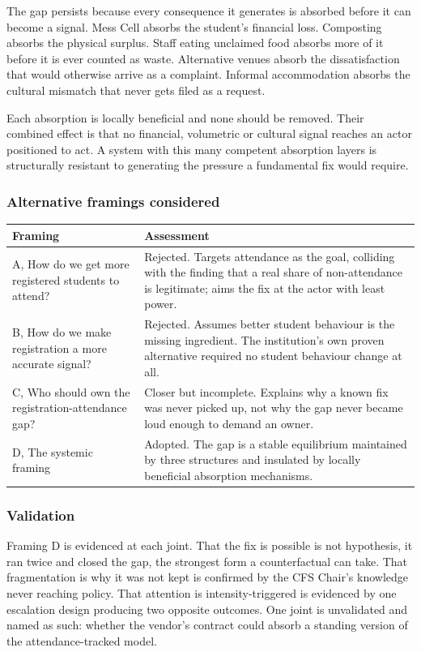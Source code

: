 \documentclass[11pt]{article}
\begin{document}
The gap persists because every consequence it generates is absorbed before it can become a signal.
Mess Cell absorbs the student's financial loss. Composting absorbs the physical surplus. Staff
eating unclaimed food absorbs more of it before it is ever counted as waste. Alternative venues
absorb the dissatisfaction that would otherwise arrive as a complaint. Informal accommodation
absorbs the cultural mismatch that never gets filed as a request.

Each absorption is locally beneficial and none should be removed. Their combined effect is that no
financial, volumetric or cultural signal reaches an actor positioned to act. A system with this many
competent absorption layers is structurally resistant to generating the pressure a fundamental fix
would require.

\subsubsection*{Alternative framings considered}

\begin{longtable}{L{0.28\textwidth}L{0.66\textwidth}}
\toprule
\textbf{Framing} & \textbf{Assessment} \\
\midrule
\endhead
A, How do we get more registered students to attend? & Rejected. Targets attendance as the goal,
colliding with the finding that a real share of non-attendance is legitimate; aims the fix at the
actor with least power. \\[4pt]
B, How do we make registration a more accurate signal? & Rejected. Assumes better student
behaviour is the missing ingredient. The institution's own proven alternative required no student
behaviour change at all. \\[4pt]
C, Who should own the registration-attendance gap? & Closer but incomplete. Explains why a known
fix was never picked up, not why the gap never became loud enough to demand an owner. \\[4pt]
D, The systemic framing & Adopted. The gap is a stable equilibrium maintained by three structures
and insulated by locally beneficial absorption mechanisms. \\
\bottomrule
\end{longtable}

\subsubsection*{Validation}

Framing D is evidenced at each joint. That the fix is possible is not hypothesis, it ran twice
and closed the gap, the strongest form a counterfactual can take. That fragmentation is why it was
not kept is confirmed by the CFS Chair's knowledge never reaching policy. That attention is
intensity-triggered is evidenced by one escalation design producing two opposite outcomes. One joint
is unvalidated and named as such: whether the vendor's contract could absorb a standing version of
the attendance-tracked model.
\end{document}
